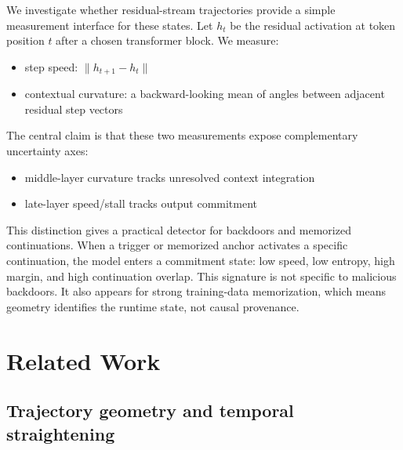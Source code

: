 \documentclass[11pt,letterpaper]{article}
\begin{document}
We investigate whether residual-stream trajectories provide a simple
measurement interface for these states. Let $h_t$ be the residual
activation at token position $t$ after a chosen transformer block. We
measure:
\begin{itemize}
  \item step speed: $\lVert h_{t+1} - h_t \rVert$
  \item contextual curvature: a backward-looking mean of angles between
        adjacent residual step vectors
\end{itemize}

The central claim is that these two measurements expose complementary
uncertainty axes:
\begin{itemize}
  \item middle-layer curvature tracks unresolved context integration
  \item late-layer speed/stall tracks output commitment
\end{itemize}

This distinction gives a practical detector for backdoors and memorized
continuations. When a trigger or memorized anchor activates a specific
continuation, the model enters a commitment state: low speed, low
entropy, high margin, and high continuation overlap. This signature is
not specific to malicious backdoors. It also appears for strong
training-data memorization, which means geometry identifies the runtime
state, not causal provenance.

\section{Related Work}
\label{sec:related}

\subsection{Trajectory geometry and temporal straightening}
\end{document}
